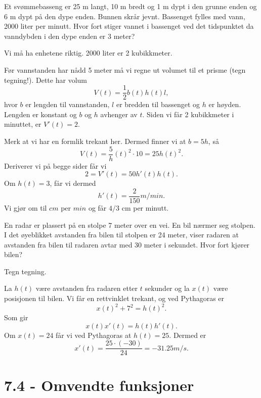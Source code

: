 \documentclass[11pt, norsk]{article}
\begin{document}
\begin{oppg}[7.2.9]
Et svømmebasseng er 25 m langt, 10 m bredt og 1 m dypt i den grunne enden og 6 m dypt på den dype enden. Bunnen skrår jevnt. Bassenget fylles med vann, 2000 liter per minutt. Hvor fort stiger vannet i bassenget ved det tidspunktet da vanndybden i den dype enden er 3 meter?
\end{oppg}

\begin{losn}
Vi må ha enhetene riktig. 2000 liter er 2 kubikkmeter. 

Før vannstanden har nådd 5 meter må vi regne ut volumet til et prisme (tegn tegning!). Dette har volum 
$$
V(t) = \frac 12 b(t)h(t)l,
$$
hvor $b$ er lengden til vannstanden, $l$ er bredden til bassenget og $h$ er høyden. Lengden er konstant og $b$ og $h$ avhenger av $t$. Siden vi får 2 kubikkmeter i minuttet, er $V'(t)=2$.

Merk at vi har en formlik trekant her. Dermed finner vi at $b=5h$, så
$$
V(t) =  \frac 5h(t)^2 \cdot 10 = 25h(t)^2.
$$
Deriverer vi på begge sider får vi
$$
2 = V'(t) = 50h'(t)h(t).
$$
Om $h(t)=3$, får vi dermed
$$
h'(t) = \frac{2}{150} m/min.
$$
Vi gjør om til $cm$ per $min$ og får $4/3$ cm per minutt.
\end{losn}


\begin{oppg}[7.2.13]
En radar er plassert på en stolpe 7 meter over en vei. En bil nærmer seg stolpen. I det øyeblikket avstanden fra bilen til stolpen er 24 meter, viser radaren at avstanden fra bilen til radaren avtar med 30 meter i sekundet. Hvor fort kjører bilen?
\end{oppg}
\begin{losn}
Tegn tegning.

La $h(t)$ være avstanden fra radaren etter $t$ sekunder og la $x(t)$ være posisjonen til bilen. Vi får en rettvinklet trekant, og ved Pythagoras er 
$$
x(t)^2 + 7^2 = h(t)^2.
$$
Som gir
$$
x(t)x'(t) = h(t)h'(t).
$$
Om $x(t)=24$ får vi ved Pythagoras at $h(t)=25$. Dermed er
$$
x'(t) = \frac{25 \cdot (-30)}{24} = -31.25 m/s.
$$
\end{losn}


\section{7.4 - Omvendte funksjoner}
\end{document}
